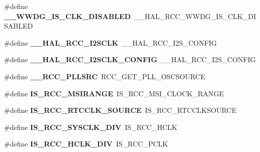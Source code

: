 \begin{DoxyCompactItemize}
\#define {\bfseries \+\_\+\+\_\+\+W\+W\+D\+G\+\_\+\+I\+S\+\_\+\+C\+L\+K\+\_\+\+D\+I\+S\+A\+B\+L\+ED}~\+\_\+\+\_\+\+H\+A\+L\+\_\+\+R\+C\+C\+\_\+\+W\+W\+D\+G\+\_\+\+I\+S\+\_\+\+C\+L\+K\+\_\+\+D\+I\+S\+A\+B\+L\+ED
\item 
\mbox{\label{group___h_a_l___r_c_c___aliased_ga6b96f4a2f2c7dc9219b24883e8bea223}} 
\#define {\bfseries \+\_\+\+\_\+\+H\+A\+L\+\_\+\+R\+C\+C\+\_\+\+I2\+S\+C\+LK}~\+\_\+\+\_\+\+H\+A\+L\+\_\+\+R\+C\+C\+\_\+\+I2\+S\+\_\+\+C\+O\+N\+F\+IG
\item 
\mbox{\label{group___h_a_l___r_c_c___aliased_gadc772f9067a6f4591305fe7dc0603447}} 
\#define {\bfseries \+\_\+\+\_\+\+H\+A\+L\+\_\+\+R\+C\+C\+\_\+\+I2\+S\+C\+L\+K\+\_\+\+C\+O\+N\+F\+IG}~\+\_\+\+\_\+\+H\+A\+L\+\_\+\+R\+C\+C\+\_\+\+I2\+S\+\_\+\+C\+O\+N\+F\+IG
\item 
\mbox{\label{group___h_a_l___r_c_c___aliased_ga181e9fea5e2a50d09d2b32f5ebf78794}} 
\#define {\bfseries \+\_\+\+\_\+\+R\+C\+C\+\_\+\+P\+L\+L\+S\+RC}~R\+C\+C\+\_\+\+G\+E\+T\+\_\+\+P\+L\+L\+\_\+\+O\+S\+C\+S\+O\+U\+R\+CE
\item 
\mbox{\label{group___h_a_l___r_c_c___aliased_gad3f63ae7a859b8f5395aaf703ac72694}} 
\#define {\bfseries I\+S\+\_\+\+R\+C\+C\+\_\+\+M\+S\+I\+R\+A\+N\+GE}~I\+S\+\_\+\+R\+C\+C\+\_\+\+M\+S\+I\+\_\+\+C\+L\+O\+C\+K\+\_\+\+R\+A\+N\+GE
\item 
\mbox{\label{group___h_a_l___r_c_c___aliased_gafbf1d14cdfb90a3da2148a8b398fae50}} 
\#define {\bfseries I\+S\+\_\+\+R\+C\+C\+\_\+\+R\+T\+C\+C\+L\+K\+\_\+\+S\+O\+U\+R\+CE}~I\+S\+\_\+\+R\+C\+C\+\_\+\+R\+T\+C\+C\+L\+K\+S\+O\+U\+R\+CE
\item 
\mbox{\label{group___h_a_l___r_c_c___aliased_ga43366c08676a120c9c7ec17169183054}} 
\#define {\bfseries I\+S\+\_\+\+R\+C\+C\+\_\+\+S\+Y\+S\+C\+L\+K\+\_\+\+D\+IV}~I\+S\+\_\+\+R\+C\+C\+\_\+\+H\+C\+LK
\item 
\mbox{\label{group___h_a_l___r_c_c___aliased_ga10acdfe634bde9d8591127e09c290178}} 
\#define {\bfseries I\+S\+\_\+\+R\+C\+C\+\_\+\+H\+C\+L\+K\+\_\+\+D\+IV}~I\+S\+\_\+\+R\+C\+C\+\_\+\+P\+C\+LK

\end{DoxyCompactItemize}
